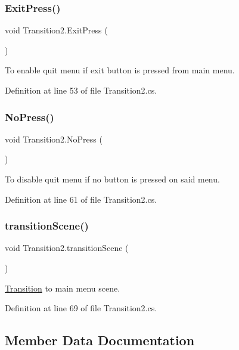 \subsubsection{\texorpdfstring{Exit\+Press()}{ExitPress()}}
{\footnotesize\ttfamily void Transition2.\+Exit\+Press (\begin{DoxyParamCaption}{ }\end{DoxyParamCaption})}

To enable quit menu if exit button is pressed from main menu. 

Definition at line 53 of file Transition2.\+cs.

\hypertarget{class_transition2_a3d85518cb434a02cf4635ff8fc1d4b65}{}\label{class_transition2_a3d85518cb434a02cf4635ff8fc1d4b65} 
\subsubsection{\texorpdfstring{No\+Press()}{NoPress()}}
{\footnotesize\ttfamily void Transition2.\+No\+Press (\begin{DoxyParamCaption}{ }\end{DoxyParamCaption})}

To disable quit menu if no button is pressed on said menu. 

Definition at line 61 of file Transition2.\+cs.

\hypertarget{class_transition2_a051383599c21c51604589cadec4bdcf1}{}\label{class_transition2_a051383599c21c51604589cadec4bdcf1} 
\subsubsection{\texorpdfstring{transition\+Scene()}{transitionScene()}}
{\footnotesize\ttfamily void Transition2.\+transition\+Scene (\begin{DoxyParamCaption}{ }\end{DoxyParamCaption})}

\hyperlink{class_transition}{Transition} to main menu scene. 

Definition at line 69 of file Transition2.\+cs.



\subsection{Member Data Documentation}
\hypertarget{class_transition2_a2f95f61b801d5c9995910a8c7b3ed48d}{}\label{class_transition2_a2f95f61b801d5c9995910a8c7b3ed48d} 
